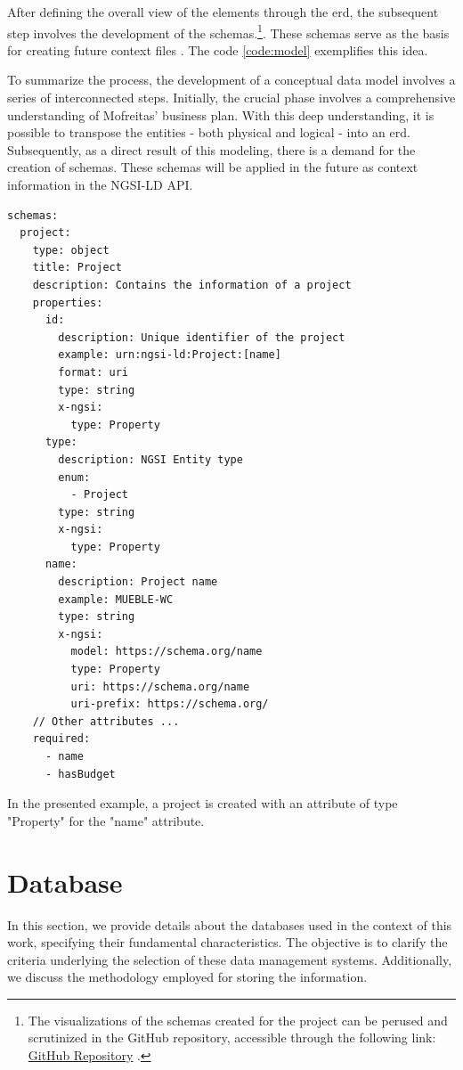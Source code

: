 After defining the overall view of the elements through the \acrfull{erd}, the subsequent step involves the development of the schemas.\footnote{The visualizations of the schemas created for the project can be perused and scrutinized in the GitHub repository, accessible through the following link: \href{https://github.com/More-Collaborative-Laboratory/ww4zero}{GitHub Repository}
.}. These schemas serve as the basis for creating future context files \cite{fiware_ngsi-ld_nodate}. The code \ref{code:model} exemplifies this idea.

To summarize the process, the development of a conceptual data model involves a series of interconnected steps. Initially, the crucial phase involves a comprehensive understanding of Mofreitas' business plan. With this deep understanding, it is possible to transpose the entities - both physical and logical - into an \acrfull{erd}. Subsequently, as a direct result of this modeling, there is a demand for the creation of schemas. These schemas will be applied in the future as context information in the NGSI-LD API.

\begin{listing}[H]
\begin{verbatim}
schemas:
  project:
    type: object
    title: Project
    description: Contains the information of a project
    properties:
      id:
        description: Unique identifier of the project
        example: urn:ngsi-ld:Project:[name]
        format: uri
        type: string
        x-ngsi:
          type: Property
      type:
        description: NGSI Entity type
        enum:
          - Project
        type: string
        x-ngsi:
          type: Property
      name:
        description: Project name
        example: MUEBLE-WC
        type: string
        x-ngsi:
          model: https://schema.org/name
          type: Property
          uri: https://schema.org/name
          uri-prefix: https://schema.org/
    // Other attributes ...
    required:
      - name
      - hasBudget
\end{verbatim}
\caption{In the presented example, a project is created with an attribute of type "Property" for the "name" attribute.}
\label{code:model}
\end{listing}
\section{Database}\label{section:mmDataBase}

In this section, we provide details about the databases used in the context of this work, specifying their fundamental characteristics. The objective is to clarify the criteria underlying the selection of these data management systems. Additionally, we discuss the methodology employed for storing the information.

